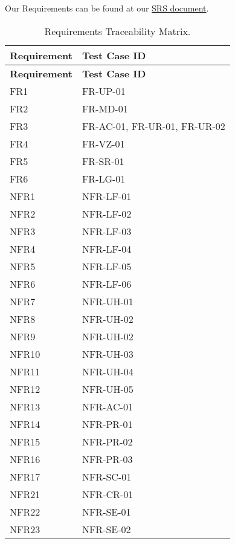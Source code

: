 \documentclass[12pt, titlepage]{article}
\begin{document}
Our Requirements can be found at our \href{https://github.com/PaisWillie/Digital-Composite/blob/main/docs/SRS-Volere/SRS.pdf}{SRS document}.

\renewcommand{\arraystretch}{1.3} %
\begin{longtable}{|p{4cm}|p{8cm}|}
\caption{Requirements Traceability Matrix.} \label{tab:long} \\
    \hline
    \textbf{Requirement} & \textbf{Test Case ID} \\
    \hline
    \endfirsthead
    
    \hline
    \textbf{Requirement} & \textbf{Test Case ID} \\
    \hline
    \endhead
    
    FR1 & FR-UP-01 \\\hline
    FR2 & FR-MD-01 \\\hline
    FR3 & FR-AC-01, FR-UR-01, FR-UR-02 \\\hline
    FR4 & FR-VZ-01 \\\hline
    FR5 & FR-SR-01 \\\hline
    FR6 & FR-LG-01 \\\hline
    NFR1 & NFR-LF-01 \\\hline
    NFR2 & NFR-LF-02 \\\hline
    NFR3 & NFR-LF-03 \\\hline
    NFR4 & NFR-LF-04 \\\hline
    NFR5 & NFR-LF-05 \\\hline
    NFR6 & NFR-LF-06 \\\hline
    NFR7 & NFR-UH-01 \\\hline
    NFR8 & NFR-UH-02 \\\hline
    NFR9 & NFR-UH-02 \\\hline
    NFR10 & NFR-UH-03 \\\hline
    NFR11 & NFR-UH-04 \\\hline
    NFR12 & NFR-UH-05 \\\hline
    NFR13 & NFR-AC-01 \\\hline
    NFR14 & NFR-PR-01 \\\hline
    NFR15 & NFR-PR-02 \\\hline
    NFR16 & NFR-PR-03 \\\hline
    NFR17 & NFR-SC-01 \\\hline
    NFR21 & NFR-CR-01 \\\hline
    NFR22 & NFR-SE-01 \\\hline
    NFR23 & NFR-SE-02 \\\hline

\end{longtable}
\end{document}
